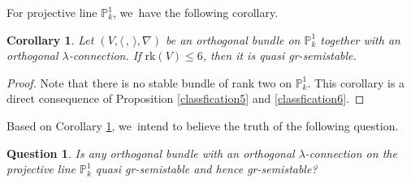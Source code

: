 \documentclass[11pt]{article}
\numberwithin{equation}{section}
\newcommand{\lconnection}{$\lambda$\nobreakdash-con\-nec\-tion\xspace}
\newcommand{\grsemistable}{gr\nobreakdash-semi\-stable\xspace}
\newcommand{\PP}{{\mathbb P}}
\newcommand{\rk}{\mathrm{rk}}
\theoremstyle{plain}
\newtheorem{cor}[thm]{Corollary}
\newtheorem{ques}[thm]{Question}
\theoremstyle{definition}
\begin{document}
For projective line $\mathbb{P}^1_k$, we~have the following corollary. 
\begin{cor}\label{proline5}
Let $(V,\langle \,, \, \rangle,\nabla)$ be an orthogonal bundle on $\mathbb{P}^1_k$ together with an orthogonal \lconnection. If $\rk(V) \leq 6$, then it is quasi \grsemistable.
\end{cor}

\begin{proof}
Note that there is no stable bundle of rank two on $\mathbb{P}^1_k$. This corollary is a direct consequence of Proposition \ref{classfication5} and \ref{classfication6}.
\end{proof}

Based on Corollary \ref{proline5}, we~intend to believe the truth of the following question.

\begin{ques}
Is any orthogonal bundle with an orthogonal \lconnection on the projective line $\PP^1_k$ quasi \grsemistable and hence \grsemistable?
\end{ques}\label{prolineconj}


\end{document}
